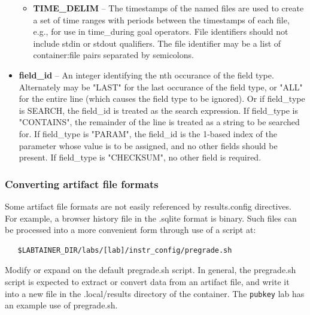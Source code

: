 \documentclass[12pt]{article}
\begin{document}
\begin{itemize}
\begin{itemize}
\item \textbf{TIME\_DELIM} -- The timestamps of the named files are used to create 
                             a set of time ranges with periods between the 
                             timestamps of each file, e.g., for use in time\_during 
                             goal operators. File identifiers should not include
                             stdin or stdout qualifiers. The file identifier
                             may be a list of container:file pairs separated
                             by semicolons.
                             
\end{itemize} 
\item \textbf{field\_id} -- An integer identifying the nth occurance of the field type.
                        Alternately may be "LAST" for the last occurance of the 
                        field type, or "ALL" for the entire line (which causes the 
                        field type to be ignored).  Or if field\_type is SEARCH, the
                        field\_id is treated as the search expression. 
                        If field\_type is "CONTAINS", the 
                        remainder of the line is treated as a string to be 
                        searched for.  If field\_type is "PARAM", the field\_id is
                        the 1-based index of the parameter whose value is to be 
                        assigned, and no other fields should be present.
                        If field\_type is "CHECKSUM", no other field is required.
\end{itemize} 

\subsubsection{Converting artifact file formats}
Some artifact file formats are not easily referenced by results.config directives.
For example, a browser history file in the .sqlite format is binary.  Such files
can be processed into a more convenient form through use of a script at:
\begin{verbatim}
   $LABTAINER_DIR/labs/[lab]/instr_config/pregrade.sh
\end{verbatim}
\noindent Modify or expand on the default pregrade.sh script.
In general, the pregrade.sh script is expected to extract or convert
data from an artifact file, and write it into a new file in the .local/results
directory of the container.  The {\tt pubkey} lab has an example use of pregrade.sh. 
\end{document}
